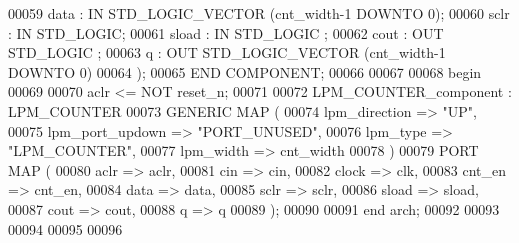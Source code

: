 \begin{DoxyCode}
00059             data          : \textcolor{keywordflow}{IN} \textcolor{comment}{STD\_LOGIC\_VECTOR} (cnt\_width\textcolor{vhdlchar}{-}\textcolor{vhdllogic}{}\textcolor{vhdllogic}{1} \textcolor{keywordflow}{DOWNTO} \textcolor{vhdllogic}{}\textcolor{vhdllogic}{0});
00060          sclr        : \textcolor{keywordflow}{IN} \textcolor{comment}{STD\_LOGIC};
00061             sload         : \textcolor{keywordflow}{IN} \textcolor{comment}{STD\_LOGIC} ;
00062             cout          : \textcolor{keywordflow}{OUT} \textcolor{comment}{STD\_LOGIC} ;
00063             q            : \textcolor{keywordflow}{OUT} \textcolor{comment}{STD\_LOGIC\_VECTOR} (cnt\_width\textcolor{vhdlchar}{-}\textcolor{vhdllogic}{}\textcolor{vhdllogic}{1} \textcolor{keywordflow}{DOWNTO} \textcolor{vhdllogic}{}\textcolor{vhdllogic}{0})
00064     );
00065     \textcolor{keywordflow}{END} \textcolor{keywordflow}{COMPONENT};
00066 
00067   
00068 \textcolor{vhdlkeyword}{begin}
00069 
00070 \textcolor{vhdlchar}{aclr} \textcolor{vhdlchar}{<=} \textcolor{keywordflow}{NOT} \textcolor{vhdlchar}{reset_n};
00071 
00072     LPM\_COUNTER\_component : LPM\_COUNTER
00073     \textcolor{keywordflow}{GENERIC} \textcolor{keywordflow}{MAP} (
00074         lpm\_direction     => \textcolor{keyword}{"UP"},
00075         lpm\_port\_updown   => \textcolor{keyword}{"PORT\_UNUSED"},
00076         lpm\_type          => \textcolor{keyword}{"LPM\_COUNTER"},
00077         lpm\_width         => cnt_width
00078     \textcolor{vhdlchar}{)}
00079     \textcolor{keywordflow}{PORT} \textcolor{keywordflow}{MAP} (
00080         aclr     => aclr,
00081         cin      => cin,
00082         clock    => clk,
00083         cnt\_en   => cnt_en,
00084         data     => data,
00085       sclr     => sclr,
00086         sload    => sload,
00087         cout     => cout,
00088         q        => q
00089     \textcolor{vhdlchar}{)};
00090   
00091 \textcolor{keywordflow}{end} \textcolor{vhdlchar}{arch};   
00092 
00093 
00094 
00095 
00096 
\end{DoxyCode}
